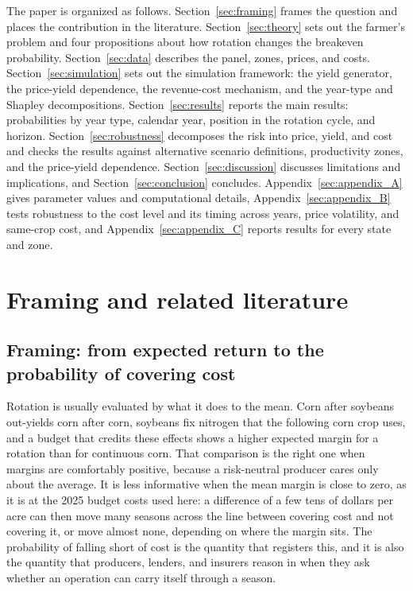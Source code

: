 \documentclass[11pt,letterpaper]{article}
\theoremstyle{remark}
\begin{document}
The paper is organized as follows. Section~\ref{sec:framing} frames the question and places the contribution in the literature. Section~\ref{sec:theory} sets out the farmer's problem and four propositions about how rotation changes the breakeven probability. Section~\ref{sec:data} describes the panel, zones, prices, and costs. Section~\ref{sec:simulation} sets out the simulation framework: the yield generator, the price-yield dependence, the revenue-cost mechanism, and the year-type and Shapley decompositions. Section~\ref{sec:results} reports the main results: probabilities by year type, calendar year, position in the rotation cycle, and horizon. Section~\ref{sec:robustness} decomposes the risk into price, yield, and cost and checks the results against alternative scenario definitions, productivity zones, and the price-yield dependence. Section~\ref{sec:discussion} discusses limitations and implications, and Section~\ref{sec:conclusion} concludes. Appendix~\ref{sec:appendix_A} gives parameter values and computational details, Appendix~\ref{sec:appendix_B} tests robustness to the cost level and its timing across years, price volatility, and same-crop cost, and Appendix~\ref{sec:appendix_C} reports results for every state and zone.

\section{\label{sec:framing}Framing and related literature}

\subsection{Framing: from expected return to the probability of covering cost}

Rotation is usually evaluated by what it does to the mean. Corn after soybeans out-yields corn after corn, soybeans fix nitrogen that the following corn crop uses, and a budget that credits these effects shows a higher expected margin for a rotation than for continuous corn. That comparison is the right one when margins are comfortably positive, because a risk-neutral producer cares only about the average. It is less informative when the mean margin is close to zero, as it is at the 2025 budget costs used here: a difference of a few tens of dollars per acre can then move many seasons across the line between covering cost and not covering it, or move almost none, depending on where the margin sits. The probability of falling short of cost is the quantity that registers this, and it is also the quantity that producers, lenders, and insurers reason in when they ask whether an operation can carry itself through a season.
\end{document}
